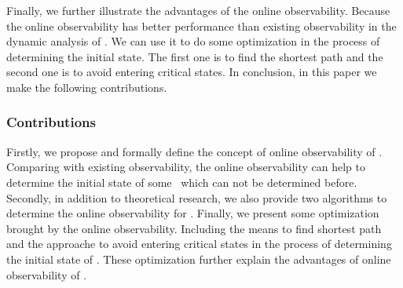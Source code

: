 Finally, we further illustrate the advantages of the online observability. Because the online observability has better performance than existing observability in the dynamic analysis of \BCNs.
We can use it to do some optimization in the process of determining the initial state. The first one is to find the shortest path and the second one is to avoid entering critical states. 
In conclusion, in this paper we make the following contributions. 


\subsubsection*{Contributions}
Firstly, we propose and formally define the concept of online observability of \BCNs. Comparing with existing observability, the online observability can help to determine the initial state of some \BCNs\ which can not be determined before. Secondly, in addition to theoretical research, we also provide two algorithms to determine the online observability for \BCNs. Finally, we present some optimization brought by the online observability. Including the means to find shortest path and the approache to avoid entering critical states in the process of determining the initial state of \BCNs.  These optimization further explain the advantages of online observability of \BCNs. %


